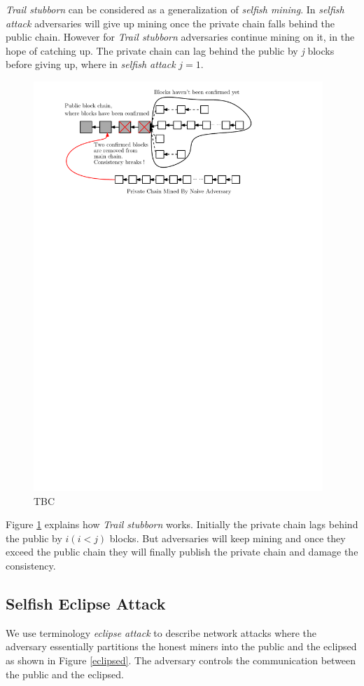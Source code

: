 \documentclass{llncs}
\begin{document}
\emph{Trail stubborn} can be considered as a generalization of \emph{selfish mining}. In \emph{selfish attack} adversaries will give up mining once the private chain falls behind the public chain. However for \emph{Trail stubborn} adversaries continue mining on it, in the hope of catching up. The private chain can lag behind the public by \emph{j} blocks before giving up, where in \emph{selfish attack} $j = 1$.
\vspace{-4mm}
\begin{figure}
\centering
\includegraphics[width=4.3in]{Figures/Naive-Attack.pdf}
\vspace{-3mm}
\caption{TBC}
\label{trail}
\end{figure}

Figure \ref{trail} explains how \emph{Trail stubborn} works. Initially the private chain lags behind the public by  $i (i < j)$ blocks. But adversaries will keep mining and once they exceed the public chain they will finally publish the private chain and damage the consistency.
\subsection{Selfish Eclipse Attack}
\quad We use terminology \emph{eclipse attack} to describe network attacks where the adversary essentially partitions the honest miners into the public and the eclipsed as shown in Figure \ref{eclipsed}. The adversary controls the communication between the public and the eclipsed.
\end{document}
